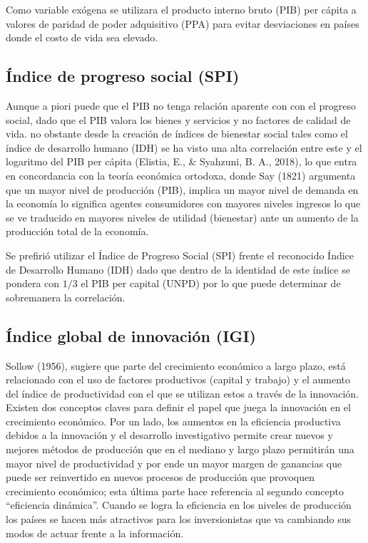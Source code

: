 \documentclass[11pt]{article}
\begin{document}
{Como variable exógena se utilizara el producto interno bruto (PIB) per cápita a valores de paridad de poder adquisitivo (PPA) para evitar desviaciones en países donde el costo de vida sea elevado.


\subsection{Índice de progreso social (SPI)}

Aunque a piori puede que el PIB no tenga relación aparente con con el progreso social, dado que el PIB valora los bienes y servicios y no factores de calidad de vida. no obstante desde la creación de índices de bienestar social tales como el índice de desarrollo humano (IDH) se ha visto una alta correlación entre este y el logaritmo del PIB per cápita (Elistia, E., \& Syahzuni, B. A., 2018), lo que entra en concordancia con la teoría económica ortodoxa, donde Say (1821) argumenta que un mayor nivel de producción (PIB), implica un mayor nivel de demanda en la economía lo significa agentes consumidores con mayores niveles ingresos lo que se ve traducido en mayores niveles de utilidad (bienestar) ante un aumento de la producción total de la economía. 

Se prefirió utilizar el Índice de Progreso Social (SPI) frente el reconocido Índice de Desarrollo Humano (IDH) dado que dentro de la identidad de este índice se pondera con $1/3$ el PIB per capital (UNPD) por lo que puede determinar de sobremanera la correlación.


\subsection{Índice global de innovación (IGI)}



Sollow (1956), sugiere que parte del crecimiento económico a largo plazo, está relacionado con el uso de factores productivos (capital y trabajo) y el aumento del índice de productividad con el que se utilizan estos a través de la innovación. Existen dos conceptos claves para definir el papel que juega la innovación en el crecimiento económico. Por un lado, los aumentos en la eficiencia productiva debidos a la innovación y el desarrollo investigativo permite crear nuevos y mejores métodos de producción que en el mediano y largo plazo permitirán una mayor nivel de productividad y por ende un mayor margen de ganancias que puede ser reinvertido en nuevos procesos de producción que provoquen crecimiento económico; esta última parte hace referencia al segundo concepto “eficiencia dinámica”. Cuando se logra la eficiencia en los niveles de producción los países se hacen más atractivos para los inversionistas que va cambiando sus modos de actuar frente a la información.

}
\end{document}
